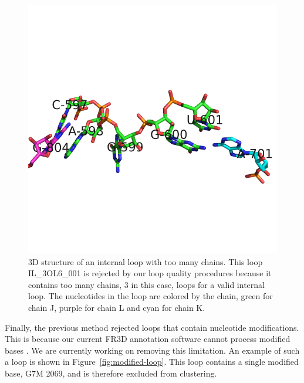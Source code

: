 \begin{figure}
  \includegraphics[width=\textwidth]{chapter-5/figs/loops/IL-3OL6-001}
  \caption{3D structure of an internal loop with too many chains. This loop
    IL\_3OL6\_001 is rejected by our loop quality procedures because it contains
    too many chains, 3 in this case, loops for a valid internal loop. The
  nucleotides in the loop are colored by the chain, green for chain J, purple
for chain L and cyan for chain K.}
  \label{fig:too-many-chains}
\end{figure}

Finally, the previous method rejected loops that contain nucleotide
modifications. This is because our current FR3D annotation software cannot
process modified bases \cite{Sarver2008a}. We are currently working on removing
this limitation. An example of such a loop is shown in
Figure~\ref{fig:modified-loop}. This loop contains a single modified base, G7M
2069, and is therefore excluded from clustering.


